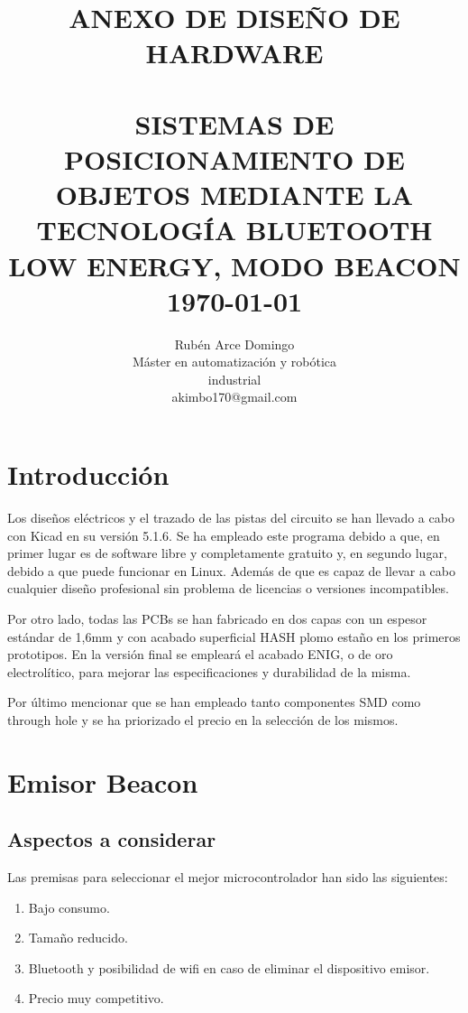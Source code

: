 \documentclass[paper=a4, fontsize=11pt,twoside]{scrartcl}	%
\title{	\normalsize \textsc{ANEXO DE DISEÑO DE HARDWARE} 	%
		 	\\[2.0cm]								%
			\HRule{0.5pt} \\						%
			\LARGE \textbf{\uppercase{Sistemas de posicionamiento de objetos mediante la tecnología Bluetooth Low Energy, modo Beacon}}	%
			\HRule{2pt} \\ [0.5cm]		%
			\normalsize \today			%
		}
\author{
		Rubén Arce Domingo\\	
		Máster en automatización y robótica\\	
        industrial\\
        akimbo170@gmail.com \\
}
\makeatletter
\def\printtitle{%
    {\centering \@title\par}}
\def\printauthor{%
    {\centering \large \@author}}
\makeatother
\begin{document}
\thispagestyle{empty}		%
\printtitle					%
  	\vfill
\printauthor				%
\newpage


\cleardoublepage
\tableofcontents
\listoffigures
\cleardoublepage
\pagestyle{fancy}

\section{Introducción}
    Los diseños eléctricos y el trazado de las pistas del circuito se han llevado a cabo con Kicad en 
    su versión 5.1.6. Se ha empleado este programa debido a que, en primer lugar es de software libre y
    completamente gratuito y, en segundo lugar, debido a que puede funcionar en Linux. Además de que es capaz de llevar a cabo 
    cualquier diseño profesional sin problema de licencias o versiones incompatibles.

    Por otro lado, todas las PCBs se han fabricado en dos capas con un espesor estándar de 1,6mm y con acabado superficial
    HASH plomo estaño en los primeros prototipos. En la versión final se empleará el acabado ENIG, o de oro 
    electrolítico, para mejorar las especificaciones y durabilidad de la misma.

    Por último mencionar que se han empleado tanto componentes SMD como through hole y se ha priorizado el precio en la selección de los mismos.
\section{Emisor Beacon}
    \subsection{Aspectos a considerar}
        Las premisas para seleccionar el mejor microcontrolador han sido las siguientes: 
        \begin{enumerate}
            \item Bajo consumo.
            \item Tamaño reducido.
            \item Bluetooth y posibilidad de wifi en caso de eliminar el dispositivo emisor.
            \item Precio muy competitivo.
        \end{enumerate}
\end{document}
